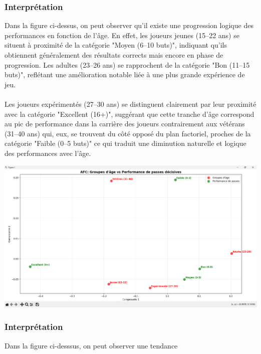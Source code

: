 \documentclass[12pt]{scrartcl}
\begin{document}
            \subsubsection{Interprétation}
                Dans la figure ci-dessus, on peut observer qu'il existe une progression logique des performances en fonction de l’âge. En effet, les joueurs jeunes (15–22 ans) se situent à proximité de la catégorie "Moyen (6–10 buts)", indiquant qu’ils obtiennent généralement des résultats corrects mais encore en phase de progression. Les adultes (23–26 ans) se rapprochent de la catégorie "Bon (11–15 buts)", reflétant une amélioration notable liée à une plus grande expérience de jeu.\\\\
                Les joueurs expérimentés (27–30 ans) se distinguent clairement par leur proximité avec la catégorie "Excellent (16+)", suggérant que cette tranche d’âge correspond au pic de performance dans la carrière des joueurs contrairement aux vétérans (31–40 ans) qui, eux, se trouvent du côté opposé du plan factoriel, proches de la catégorie "Faible (0–5 buts)" ce qui traduit une diminution naturelle et logique des performances avec l’âge.\\

                \begin{center}
                    \includegraphics[width=1\textwidth]{images/graphique_AFC_passes.png}
                \end{center}

            \subsubsection{Interprétation}
                Dans la figure ci-desssus, on peut observer une tendance 
\end{document}
